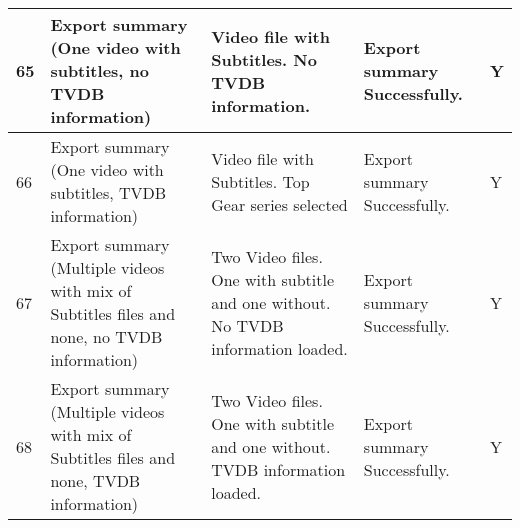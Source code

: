 \begin{center}
\begin{longtable}{| p{18pt} | p{100pt}| p{100pt}| p{110pt} | p{46pt} |}
\\\hline
65	&Export summary (One video with subtitles, no TVDB information)			&Video file with Subtitles. No TVDB information.			&Export summary Successfully.	&Y
\\\hline
66	&Export summary (One video with subtitles, TVDB information)			&Video file with Subtitles. Top Gear series selected			&Export summary Successfully.	&Y
\\\hline					
67	&Export summary (Multiple videos with mix of Subtitles files and none, no TVDB information) &Two Video files. One with subtitle and one without. No TVDB information loaded.	&Export summary Successfully.		&Y	
\\\hline
68	&Export summary (Multiple videos with mix of Subtitles files and none, TVDB information)	&Two Video files. One with subtitle and one without. TVDB information loaded.	&Export summary Successfully.		&Y
\\\hline
\end{longtable}
\end{center}